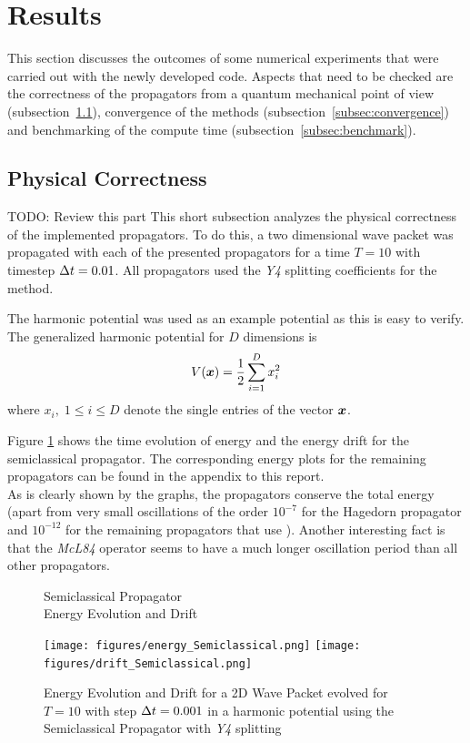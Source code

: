 \section{Results}
\label{sec:results}
%
This section discusses the outcomes of some numerical experiments that were carried out with the newly developed code.
Aspects that need to be checked are the correctness of the propagators from a quantum mechanical point of view (subsection~\ref{subsec:physical}), convergence of the methods (subsection~\ref{subsec:convergence}) and benchmarking of the compute time (subsection~\ref{subsec:benchmark}).

\subsection{Physical Correctness}
\label{subsec:physical}
{\Huge TODO: Review this part}
%
This short subsection analyzes the physical correctness of the implemented propagators.
To do this, a two dimensional wave packet was propagated with each of the presented propagators for a time $T = 10$ with timestep $\Delta t = 0.01$.
All propagators used the \emph{Y4} splitting coefficients for the  method.
\par\medskip
%
The harmonic potential was used as an example potential as this is easy to verify.
The generalized harmonic potential for $D$ dimensions is
\begin{align}
	V(\bm{x}) = 
	\frac{1}{2} \sum_{i=1}^D x_i^2
\end{align}
%
where $x_i, \; 1 \le i \le D$ denote the single entries of the vector $\bm{x}$.
\par\medskip
%
Figure \ref{fig:energy_Semiclassical} shows the time evolution of energy and the energy drift for the semiclassical propagator. The corresponding energy plots for the remaining propagators can be found in the appendix to this report. \\
As is clearly shown by the graphs, the propagators conserve the total energy (apart from very small oscillations of the order $10^{-7}$ for the Hagedorn propagator and $10^{-12}$ for the remaining propagators that use ).
Another interesting fact is that the \emph{McL84} operator seems to have a much longer oscillation period than all other propagators.
%
\begin{figure}[ht]
	\centering
	\begin{minipage}[c]{\textwidth}
		\begin{center}
			\large Semiclassical Propagator \\[1mm]
			\normalsize Energy Evolution and Drift
			\vspace{4mm}
		\end{center}
	\end{minipage}
	\texttt{[image: figures/energy\_Semiclassical.png]}
	\texttt{[image: figures/drift\_Semiclassical.png]}
	\caption{Energy Evolution and Drift for a 2D Wave Packet evolved for $T = 10$ with step $\Delta t = 0.001$ in a harmonic potential using the Semiclassical Propagator with \emph{Y4} splitting}
	\label{fig:energy_Semiclassical}
\end{figure}


